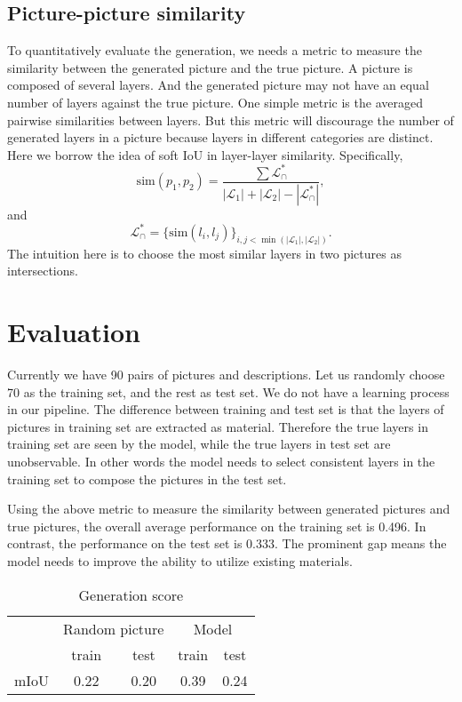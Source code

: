 \documentclass{article} %
\begin{document}
\subsection{Picture-picture similarity}
To quantitatively evaluate the generation, we needs a metric to measure the similarity between the generated picture and the true picture. A picture is composed of several layers. And the generated picture may not have an equal number of layers against the true picture. One simple metric is the averaged pairwise similarities between layers. But this metric will discourage the number of generated layers in a picture because layers in different categories are distinct. Here we borrow the idea of soft IoU in layer-layer similarity. Specifically,
$$
\mathrm{sim}(p_1,p_2) = \frac{\sum\mathcal{L}^*_\cap}{|\mathcal{L}_1|+|\mathcal{L}_2| - |\mathcal{L}^*_\cap|},
$$
and
$$
\mathcal{L}^*_\cap = \{\mathrm{sim}(l_i, l_j)\}_{i,j<\min(|\mathcal{L}_1|,|\mathcal{L}_2|)}.
$$
The intuition here is to choose the most similar layers in two pictures as intersections. 
 
 
\section{Evaluation}
Currently we have 90 pairs of pictures and descriptions. Let us randomly choose 70 as the training set, and the rest as test set. We do not have a learning process in our pipeline. The difference between training and test set is that the layers of pictures in training set are extracted as material. Therefore the true layers in training set are seen by the model, while the true layers in test set are unobservable. In other words the model needs to select consistent layers in the training set to compose the pictures in the test set.

Using the above metric to measure the similarity between generated pictures and true pictures, the overall average performance on the training set is 0.496. In contrast, the performance on the test set is 0.333. The prominent gap means the model needs to improve the ability to utilize existing materials.

\begin{table}[htbp]
	\caption{Generation score}
	\centering
	\begin{tabular}{rcccc}
		\toprule
				 & \multicolumn{2}{c}{Random picture} & \multicolumn{2}{c}{Model}\\
		\cmidrule{2-3}\cmidrule{4-5}
				 & train &  test & train & test\\
		\midrule
		mIoU & 0.22 & 0.20 & 0.39 & 0.24  \\   
		\bottomrule
	\end{tabular}%
	\label{tab: feat}
\end{table}
\end{document}
